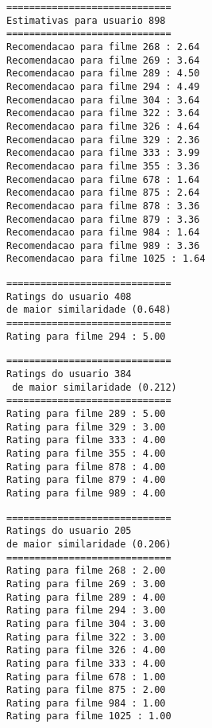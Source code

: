  
\begin{minipage} {0.45\textwidth}
\begin{lstlisting}[style=nonumbers]
=============================
Estimativas para usuario 898
=============================
Recomendacao para filme 268 : 2.64
Recomendacao para filme 269 : 3.64
Recomendacao para filme 289 : 4.50
Recomendacao para filme 294 : 4.49
Recomendacao para filme 304 : 3.64
Recomendacao para filme 322 : 3.64
Recomendacao para filme 326 : 4.64
Recomendacao para filme 329 : 2.36
Recomendacao para filme 333 : 3.99
Recomendacao para filme 355 : 3.36
Recomendacao para filme 678 : 1.64
Recomendacao para filme 875 : 2.64
Recomendacao para filme 878 : 3.36
Recomendacao para filme 879 : 3.36
Recomendacao para filme 984 : 1.64
Recomendacao para filme 989 : 3.36
Recomendacao para filme 1025 : 1.64
\end{lstlisting}

\begin{lstlisting}[style=nonumbers]
=============================
Ratings do usuario 408 
de maior similaridade (0.648)
=============================
Rating para filme 294 : 5.00
\end{lstlisting}
\end{minipage} \hspace{0.03\textwidth}%
\begin{minipage} {0.45\textwidth}
\begin{lstlisting}[style=nonumbers]
=============================
Ratings do usuario 384
 de maior similaridade (0.212)
=============================
Rating para filme 289 : 5.00
Rating para filme 329 : 3.00
Rating para filme 333 : 4.00
Rating para filme 355 : 4.00
Rating para filme 878 : 4.00
Rating para filme 879 : 4.00
Rating para filme 989 : 4.00
\end{lstlisting}

\begin{lstlisting}[style=nonumbers]
=============================
Ratings do usuario 205
de maior similaridade (0.206)
=============================
Rating para filme 268 : 2.00
Rating para filme 269 : 3.00
Rating para filme 289 : 4.00
Rating para filme 294 : 3.00
Rating para filme 304 : 3.00
Rating para filme 322 : 3.00
Rating para filme 326 : 4.00
Rating para filme 333 : 4.00
Rating para filme 678 : 1.00
Rating para filme 875 : 2.00
Rating para filme 984 : 1.00
Rating para filme 1025 : 1.00
\end{lstlisting}
\end{minipage}
